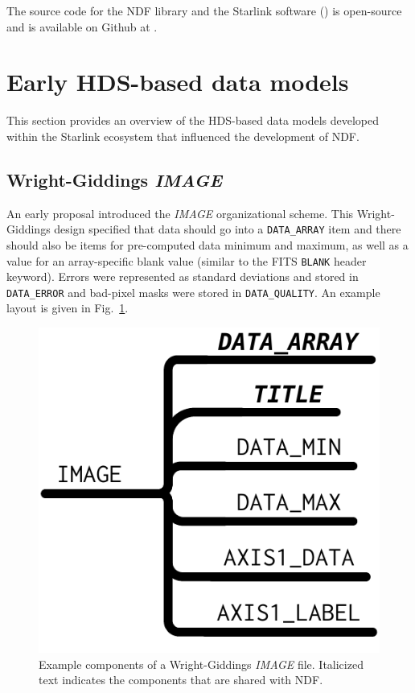 \documentclass[final,authoryear,5p,times,twocolumn]{elsarticle}
\begin{document}
The source code for the NDF library and the Starlink software
() is open-source and is available on Github at
.


\appendix

\section{Early HDS-based data models}
\label{app:chaos}

This section provides an overview of the HDS-based data models
developed within the Starlink ecosystem that influenced the
development of NDF.

\subsection{Wright-Giddings \emph{IMAGE}}
\label{app:image}

An early proposal \citep[][but see also \citet{SGP38}]{WrightGiddings1983} introduced the
\emph{IMAGE} organizational scheme. This Wright-Giddings design specified that
data should go into a \texttt{DATA\_ARRAY} item and there should also be
items for pre-computed data minimum and maximum, as well as a value for
an array-specific blank value (similar to the FITS \texttt{BLANK}
header keyword). Errors were represented as standard
deviations and stored in \texttt{DATA\_ERROR} and bad-pixel masks were
stored in \texttt{DATA\_QUALITY}. An example layout is given in Fig.~\ref{fig:image}.

\begin{figure}[t]
\begin{center}
\includegraphics[width=0.5\columnwidth]{model-image}
\end{center}
\caption{Example components of a Wright-Giddings \emph{IMAGE}
  file.  Italicized text indicates the components that are shared with NDF.}
\label{fig:image}
\end{figure}
\end{document}
